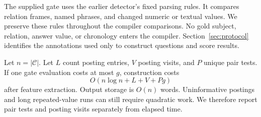 The supplied gate uses the earlier detector's fixed parsing rules.
It compares relation frames, named phrases, and changed numeric or textual values.
We preserve these rules throughout the compiler comparisons.
No gold subject, relation, answer value, or chronology enters the compiler.
Section~\ref{sec:protocol} identifies the annotations used only to construct questions and score results.

Let $n=|\mathcal C|$.
Let $L$ count posting entries, $V$ posting visits, and $P$ unique pair tests.
If one gate evaluation costs at most $g$, construction costs
\begin{equation}
O(n\log n+L+V+Pg)
\label{eq:cost}
\end{equation}
after feature extraction.
Output storage is $O(n)$ words.
Uninformative postings and long repeated-value runs can still require quadratic work.
We therefore report pair tests and posting visits separately from elapsed time.
